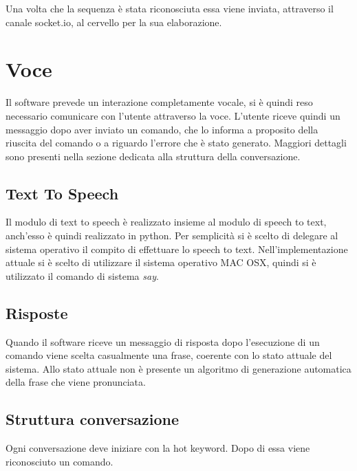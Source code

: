 \documentclass[twoside]{supsistudent}
\begin{document}
Una volta che la sequenza è stata riconosciuta essa viene inviata, attraverso il canale socket.io, al cervello per la sua elaborazione.

\chapter{Voce}

Il software prevede un interazione completamente vocale, si è quindi reso necessario comunicare con l'utente attraverso la voce.
L'utente riceve quindi un messaggio dopo aver inviato un comando, che lo informa a proposito della riuscita del comando o a riguardo l'errore che è stato generato. Maggiori dettagli sono presenti nella sezione dedicata alla struttura della conversazione.
\section{Text To Speech}
Il modulo di text to speech è realizzato insieme al modulo di speech to text, anch'esso è quindi realizzato in python. Per semplicità si è scelto di delegare al sistema operativo il compito di effettuare lo speech to text. Nell'implementazione attuale si è scelto di utilizzare il sistema operativo MAC OSX, quindi si è utilizzato il comando di sistema \textit{say}.

\section{Risposte}
Quando il software riceve un messaggio di risposta dopo l'esecuzione di un comando viene scelta casualmente una frase, coerente con lo stato attuale del sistema.
Allo stato attuale non è presente un algoritmo di generazione automatica della frase che viene pronunciata.
\section{Struttura conversazione}

Ogni conversazione deve iniziare con la hot keyword. Dopo di essa viene riconosciuto un comando.
\end{document}
